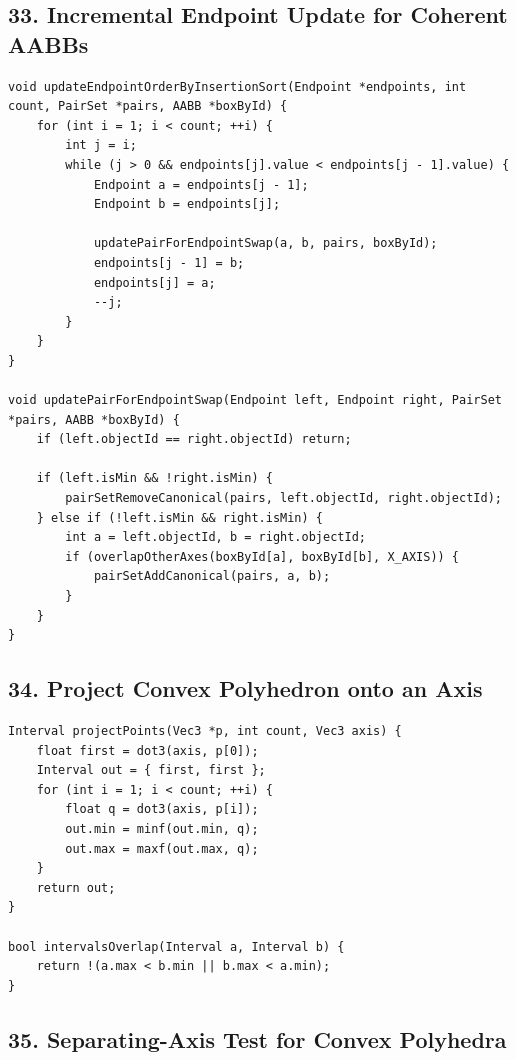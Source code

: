 \documentclass[10pt,letterpaper]{article}
\begin{document}
\subsection*{33. Incremental Endpoint Update for Coherent AABBs}

\begin{verbatim}
void updateEndpointOrderByInsertionSort(Endpoint *endpoints, int count, PairSet *pairs, AABB *boxById) {
    for (int i = 1; i < count; ++i) {
        int j = i;
        while (j > 0 && endpoints[j].value < endpoints[j - 1].value) {
            Endpoint a = endpoints[j - 1];
            Endpoint b = endpoints[j];

            updatePairForEndpointSwap(a, b, pairs, boxById);
            endpoints[j - 1] = b;
            endpoints[j] = a;
            --j;
        }
    }
}

void updatePairForEndpointSwap(Endpoint left, Endpoint right, PairSet *pairs, AABB *boxById) {
    if (left.objectId == right.objectId) return;

    if (left.isMin && !right.isMin) {
        pairSetRemoveCanonical(pairs, left.objectId, right.objectId);
    } else if (!left.isMin && right.isMin) {
        int a = left.objectId, b = right.objectId;
        if (overlapOtherAxes(boxById[a], boxById[b], X_AXIS)) {
            pairSetAddCanonical(pairs, a, b);
        }
    }
}
\end{verbatim}

\subsection*{34. Project Convex Polyhedron onto an Axis}

\begin{verbatim}
Interval projectPoints(Vec3 *p, int count, Vec3 axis) {
    float first = dot3(axis, p[0]);
    Interval out = { first, first };
    for (int i = 1; i < count; ++i) {
        float q = dot3(axis, p[i]);
        out.min = minf(out.min, q);
        out.max = maxf(out.max, q);
    }
    return out;
}

bool intervalsOverlap(Interval a, Interval b) {
    return !(a.max < b.min || b.max < a.min);
}
\end{verbatim}

\subsection*{35. Separating-Axis Test for Convex Polyhedra}
\end{document}
